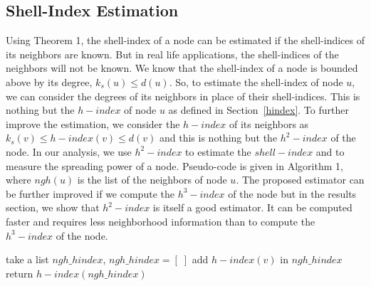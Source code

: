 \documentclass[conference]{IEEEtran}
\begin{document}

\subsection*{Shell-Index Estimation}

Using Theorem 1, the shell-index of a node can be estimated if the shell-indices of its neighbors are known. But in real life applications, the shell-indices of the neighbors will not be known. We know that the shell-index of a node is bounded above by its degree, $k_s(u) \leq d(u)$. So, to estimate the shell-index of node $u$, we can consider the degrees of its neighbors in place of their shell-indices. This is nothing but the $h-index$ of node $u$ as defined in Section~\ref{hindex}. To further improve the estimation, we consider the $h-index$ of its neighbors as $k_s(v) \leq h-index(v) \leq d(v)$ and this is nothing but the $h^2-index$ of the node. In our analysis, we use $h^2-index$ to estimate the $shell-index$ and to measure the spreading power of a node. Pseudo-code is given in Algorithm 1, where $ngh(u)$ is the list of the neighbors of node $u$. %
The proposed estimator can be further improved if we compute the $h^3-index$ of the node but in the results section, we show that $h^2-index$ is itself a good estimator. It can be computed faster and requires less neighborhood information than to compute the $h^3-index$ of the node. 

\begin{algorithm}
\caption{$Compute\_h^2-index(G,u)$}%
\begin{algorithmic}
\STATE take a list $ngh\_hindex$, $ngh\_hindex=[\; ]$
\STATE add $h-index(v)$ in $ngh\_hindex$
\ENDFOR
\STATE return $h-index(ngh\_hindex)$
\end{algorithmic}
\end{algorithm}
\end{document}
